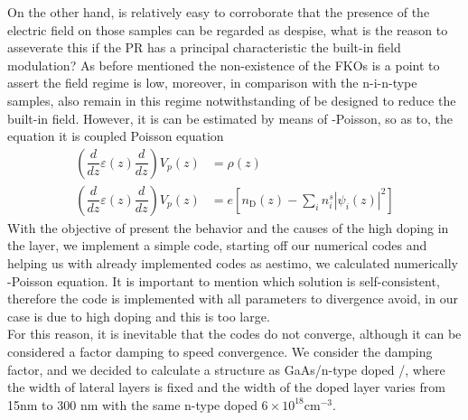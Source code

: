On the other hand, is relatively easy to corroborate that the presence of the electric field on those samples can be regarded as despise, what is the reason to asseverate this if the PR has a principal characteristic the built-in field modulation?
As before mentioned the non-existence of the FKOs is a point to assert the field regime is low, moreover, in comparison with the n-i-n-type samples, also remain in this regime notwithstanding of be designed to reduce the built-in field. However, it is can be estimated by means of \sch-Poisson, so as to, the equation  it is coupled Poisson equation\cite{jirauschek2014modeling,harrison2016chap3}
\begin{align}
	\left(\dfrac{d}{dz}\varepsilon(z)\dfrac{d}{dz}\right) V_{p}(z)&=\rho (z)
	\label{eq:chapter-3-poisson-equation-1}\\
	\left(\dfrac{d}{dz}\varepsilon(z)\dfrac{d}{dz}\right) V_{p}(z)&=e\left[n_{\mathrm{D}}(z)-\sum_{i}n_{i}^{s}\left|\psi_{i}(z)\right|^2\right]
	\label{eq:chapter-3-poisson-equation-2}
\end{align}
With the objective of present the behavior and the causes of the high doping in the \algaas layer, we implement a simple code, starting off our numerical codes and helping us with already implemented codes as \gls{aestimo}\cite{hebal2021general},  we calculated numerically \sch-Poisson equation. It is important to mention which solution is self-consistent, therefore the code is implemented with all parameters to divergence avoid,  in our case is due to high doping and this is too large.\\
For this reason, it is inevitable that the codes do not converge, although it can be considered a factor damping to speed convergence\cite{ram2004theschrodinger}.
We consider the damping factor, and we decided to calculate a structure as GaAs/n-type doped \algaas/\algaas, where the width of lateral layers is fixed and the width of the doped layer varies from 15nm to 300 nm with the same n-type doped $6\times 10^{18} \mathrm{cm^{-3}}$.
